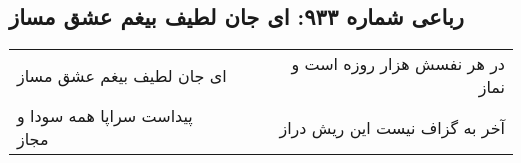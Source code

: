 \begin{center}
\section*{رباعی شماره ۹۳۳: ای جان لطیف بیغم عشق مساز}
\label{sec:0933}
\begin{longtable}{l p{0.5cm} r}
ای جان لطیف بیغم عشق مساز
&&
در هر نفسش هزار روزه است و نماز
\\
پیداست سراپا همه سودا و مجاز
&&
آخر به گزاف نیست این ریش دراز
\\
\end{longtable}
\end{center}
